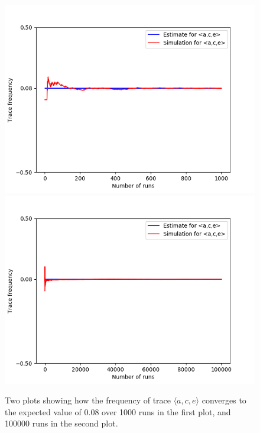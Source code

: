 \begin{figure}%
    \centering
    {{\includegraphics[width=12cm]{figures/ace1.png} }}%
    \qquad
    {{\includegraphics[width=12cm]{figures/ace100.png} }}%
    \caption{Two plots showing how the frequency of trace $\langle a,c,e \rangle$ converges to the expected value of $0.08$ over 1000 runs in the first plot, and 100000 runs in the second plot.}%
    \label{fig: ace}%
\end{figure}
%
%
%
%
%
%
